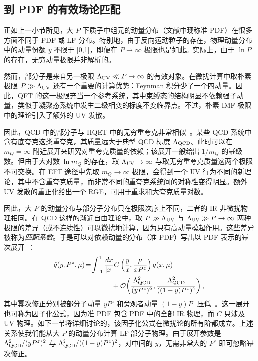\subsection{到 PDF 的有效场论匹配}
\label{sec:lamet-fact}
正如上一小节所见，大 $P$ 下质子中组元的动量分布（文献中现称准 PDF）在很多方面不同于 PDF 或 LF 分布。特别地，由于反向运动粒子的存在，物理动量分布中的动量份额 $y$ 不限于 [0,1]，即便在 $P\to\infty$ 极限也是如此。实际上，由于 $\ln P$ 的存在，无穷动量极限并非解析的。

然而，部分子是来自另一极限 $\Lambda_{\rm UV}\ll P\to \infty $ 的有效对象。在微扰计算中取朴素极限 $P\gg \Lambda_{\rm UV}$ 还有一个重要的计算优势：Feynman 积分少了一个四动量。因此，QFT 的这一极限充当一个参考系统，其中束缚态的结构明显{不依赖强子动量}，类似于凝聚态系统中发生二级相变的标度不变临界点。不过，朴素 IMF 极限中的理论引入了额外的 UV 发散。

因此，QCD 中的部分子与 HQET 中的无穷重夸克非常相似~\cite{Manohar:2000dt}。某些 QCD 系统中含有底夸克这类重夸克，其质量远大于典型 QCD 标度 $\Lambda_{\rm QCD}$。此时可以在 $m_Q=\infty$ 附近展开来研究对重夸克质量的依赖；该展开一般给出 $1/m_Q$ 的幂级数。但由于大对数 $\ln m_Q$ 的存在，取 $\Lambda_{\rm UV}\to\infty$ 与取无穷重夸克质量这两个极限不可交换。在 EFT 途径中先取 $m_Q\to\infty$ 极限，会得到一个 UV 行为不同的新理论，其中不含重夸克质量，而非常不同的重夸克系统间的对称性变得明显。额外 UV 发散的重正化给出一个 RGE，可用于重求和大夸克质量对数。

因此，大 $P$ 的动量分布与部分子分布只在极限次序上不同，二者的 IR 非微扰物理相同。在 QCD 这样的渐近自由理论中，取 $P\gg \Lambda_{\rm UV}$ 与 $\Lambda_{\rm UV} \gg P\to\infty$ 两种极限的差异（或不连续性）可以微扰地计算，因为只有高动量模起作用。这些差异被称为{\it 匹配系数}。于是可以对依赖动量的分布（准 PDF）写出以 PDF 表示的幂次展开~\cite{Xiong:2013bka,Ma:2014jla,Ma:2017pxb,Izubuchi:2018srq}：
\begin{align}\label{eq:fact_0}
	\tilde q(y, P^z, \mu)\! &=\! \int_{-1}^{1} \frac{dx}{|x|} C\left(\frac{y}{x}, \frac{\mu}{xP^z}\right) q(x,\mu)
	\nonumber \\
	&\qquad\qquad + {\cal O}\bigg(\frac{\Lambda_{\text{QCD}}^2}{(yP^z)^2},
	\frac{\Lambda_{\text{QCD}}^2}{((1-y)P^z)^2}
	\bigg)\,,
\end{align}
其中幂次修正分别被部分子动量 $yP^z$ 和旁观者动量 $(1-y)P^z$ 压低~\cite{Ji:2020brr}。这一展开{也}可称为因子化公式，因为准 PDF 包含 PDF 中的全部 IR 物理，而 $C$ 只涉及 UV 物理。如下一节将详细讨论的，该因子化公式在微扰论的所有阶都成立。上述关系使我们能从大 $P$ 的动量分布计算 LF 部分子物理。由于展开参数是 $\Lambda_{\rm QCD}^2/(yP^z)^2$ 与 $\Lambda_{\rm QCD}^2/((1-y)P^z)^2$，对中间的 $y$，无需非常大的 $P^z$ 即可忽略幂次修正。

